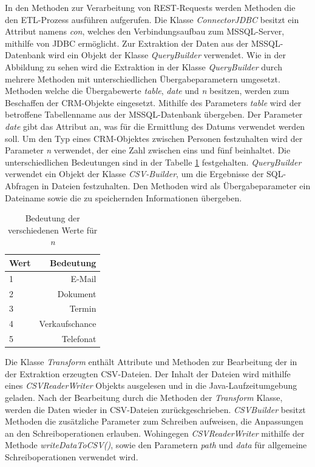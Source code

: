 In den Methoden zur Verarbeitung von REST-Requests werden Methoden die den ETL-Prozess ausführen aufgerufen. Die Klasse  \textit{ConnectorJDBC} besitzt ein Attribut namens \textit{con}, welches den Verbindungsaufbau zum MSSQL-Server, mithilfe von JDBC ermöglicht. Zur Extraktion der Daten aus der MSSQL-Datenbank wird ein Objekt der Klasse \textit{QueryBuilder} verwendet. Wie in der Abbildung zu sehen wird die Extraktion in der Klasse \textit{QueryBuilder} durch mehrere Methoden mit unterschiedlichen Übergabeparametern umgesetzt. Methoden welche die Übergabewerte \textit{table}, \textit{date} und \textit{n} besitzen, werden zum Beschaffen der CRM-Objekte eingesetzt. Mithilfe des Parameters \textit{table} wird der betroffene Tabellenname aus der MSSQL-Datenbank übergeben. Der Parameter \textit{date} gibt das Attribut an, was für die Ermittlung des Datums verwendet werden soll. Um den Typ eines CRM-Objektes zwischen Personen festzuhalten wird der Parameter \textit{n} verwendet, der eine Zahl zwischen eins und fünf beinhaltet. Die unterschiedlichen Bedeutungen sind in der Tabelle \ref{tb:BedeutungDerZahlenQueryBuilder} festgehalten. \textit{QueryBuilder} verwendet ein Objekt der Klasse \textit{CSV-Builder}, um die Ergebnisse der SQL-Abfragen in Dateien festzuhalten. Den Methoden wird als Übergabeparameter ein Dateiname sowie die zu speichernden Informationen übergeben.

\begin{table}[htbp]
\centering
\begin{tabular} {l | r}
Wert & Bedeutung  \\ \hline
1 & E-Mail \\
2 & Dokument \\
3 & Termin \\
4 & Verkaufschance \\
5 & Telefonat \\
\end{tabular}
\caption{Bedeutung der verschiedenen Werte für \textit{n}}
\label{tb:BedeutungDerZahlenQueryBuilder}
\end{table}


Die Klasse \textit{Transform} enthält Attribute und Methoden zur Bearbeitung der in der Extraktion erzeugten CSV-Dateien. Der Inhalt der Dateien wird mithilfe eines \textit{CSVReaderWriter} Objekts ausgelesen und in die Java-Laufzeitumgebung geladen. Nach der Bearbeitung durch die Methoden der \textit{Transform} Klasse, werden die Daten wieder in CSV-Dateien zurückgeschrieben. \textit{CSVBuilder} besitzt Methoden die zusätzliche Parameter zum Schreiben aufweisen, die Anpassungen an den Schreiboperationen erlauben. Wohingegen \textit{CSVReaderWriter} mithilfe der Methode \textit{writeDataToCSV()}, sowie den Parametern \textit{path} und \textit{data} für allgemeine Schreiboperationen verwendet wird.

